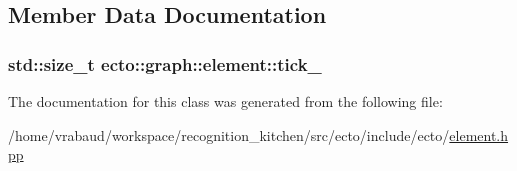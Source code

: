 \subsection{Member Data Documentation}
\hypertarget{classecto_1_1graph_1_1element_a6f850cead9edb37941344fdbd40ae112}{
\subsubsection[{tick\-\_\-}]{\setlength{\rightskip}{0pt plus 5cm}std\-::size\-\_\-t ecto\-::graph\-::element\-::tick\-\_\-\hspace{0.3cm}{\ttfamily [private]}}}\label{classecto_1_1graph_1_1element_a6f850cead9edb37941344fdbd40ae112}


The documentation for this class was generated from the following file\-:\begin{DoxyCompactItemize}
\item 
/home/vrabaud/workspace/recognition\-\_\-kitchen/src/ecto/include/ecto/\hyperlink{element_8hpp}{element.\-hpp}\end{DoxyCompactItemize}
